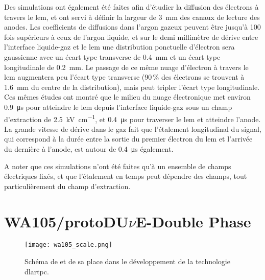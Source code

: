       Des simulations ont également été faites afin d'étudier la diffusion des électrons à travers le \gls{lem}\cite{Wu2017}, et ont servi à définir la largeur de \SI{3}{\milli\meter} des canaux de lecture des anodes. Les coefficients de diffusions dans l'argon gazeux peuvent être jusqu'à 100 fois supérieurs à ceux de l'argon liquide, et sur le demi millimètre de dérive entre l'interface liquide-gaz et le \gls{lem} une distribution ponctuelle d'électron sera gaussienne avec un écart type transverse de \SI{0.4}{\milli\meter} et un écart type longitudinale de \SI{0.2}{\milli\meter}. Le passage de ce même nuage d'électron à travers le \gls{lem} augmentera peu l'écart type transverse (90\,\% des électrons se trouvent à \SI{1.6}{\milli\meter} du centre de la distribution), mais peut tripler l'écart type longitudinale. Ces mêmes études ont montré que le milieu du nuage électronique met environ \SI{0.9}{\micro\second} pour atteindre le \gls{lem} depuis l'interface liquide-gaz sous un champ d'extraction de \SI{2.5}{\kilo\volt\per\centi\meter}, et \SI{0.4}{\micro\second} pour traverser le \gls{lem} et atteindre l'anode. La grande vitesse de dérive dans le gaz fait que l'étalement longitudinal du signal, qui correspond à la durée entre la sortie du premier électron du \gls{lem} et l'arrivée du dernière à l'anode, est autour de \SI{0.4}{\micro\second} également.

      A noter que ces simulations n'ont été faites qu'à un ensemble de champs électriques fixés, et que l'étalement en temps peut dépendre des champs, tout particulièrement du champ d'extraction.
    
  \section{WA105/\texorpdfstring{protoDU$\nu$E}{protoDUNE}-Double Phase}

    \begin{figure}[htbp]
      \begin{center}\texttt{[image: wa105\_scale.png]}\end{center}
      \caption[Schéma de .]{\label{fig::wa105}Schéma de \protodp{} et de sa place dans le développement de la technologie \gls{dlartpc}.}
    \end{figure}
    
